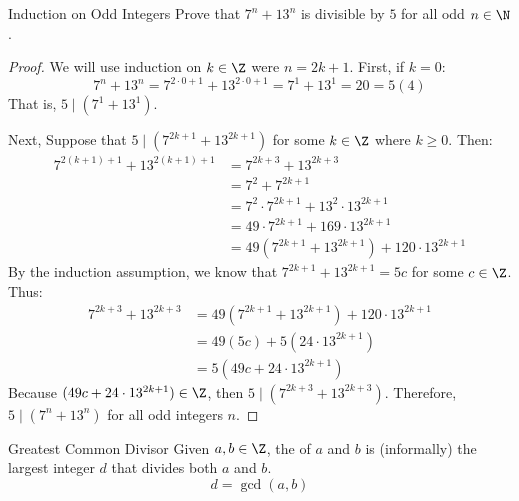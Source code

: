 \documentclass[letterpaper,12pt]{report}
\begin{document}
\begin{exbox}{Induction on Odd Integers}{}
	Prove that $7^n + 13^n$ is divisible by $5$ for all odd $n \in \N$.
	\tcblower
	\begin{proof}
		We will use induction on $k \in \Z$ were $n=2k+1$. First, if $k=0$:
		$$ 7^n + 13^n = 7^{2 \cdot 0 + 1} + 13^{2\cdot 0 + 1} = 7^1 + 13^1 = 20 = 5(4)$$
		That is, $5 \mid (7^1 + 13^1)$.

		Next, Suppose that $5 \mid (7^{2k+1} + 13^{2k+1})$ for some $k \in \Z$ where $k \geq 0$. Then:
		\begin{align*}
			7^{2(k+1)+1} + 13^{2(k+1)+1} &= 7^{2k+3} + 13^{2k+3} \\
			&= 7^2 + 7^{2k+1} \\
			&= 7^2 \cdot 7^{2k+1} + 13^2 \cdot 13^{2k+1} \\
			&= 49 \cdot 7^{2k+1} + 169 \cdot 13^{2k+1} \\
			&= 49 (7^{2k+1} + 13^{2k+1}) + 120 \cdot 13^{2k+1}
		\end{align*}
		By the induction assumption, we know that $7^{2k+1} + 13^{2k+1} = 5c$ for some $c \in \Z$. Thus:
		\begin{align*}
			7^{2k+3} + 13^{2k+3} &= 49(7^{2k+1} + 13^{2k+1}) + 120 \cdot 13^{2k+1} \\
			&= 49(5c) + 5(24 \cdot 13^{2k+1}) \\
			&= 5(49c + 24 \cdot 13^{2k+1})
		\end{align*}
		Because $(49c + 24 \cdot 13^{2k+1}) \in \Z$, then $5 \mid (7^{2k+3} + 13^{2k+3})$. Therefore, $5 \mid (7^n + 13^n)$ for all odd integers $n$.
	\end{proof}
\end{exbox}

\begin{dfnbox}{Greatest Common Divisor}{}
	Given $a,b \in \Z$, the  of $a$ and $b$ is (informally) the largest integer $d$ that divides both $a$ and $b$.
	$$d = \gcd(a,b)$$
\end{dfnbox}
\end{document}
